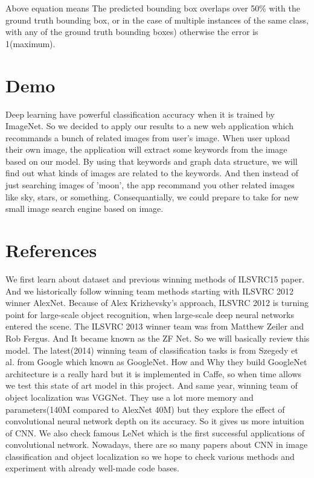\documentclass[10pt,twocolumn,letterpaper]{article}
\begin{document}
Above equation means The predicted bounding box overlaps over 50\% with the ground truth bounding box, or in the case of multiple instances of the same class, with any of the ground truth bounding boxes) otherwise the error is 1(maximum).

\section{Demo}

Deep learning have powerful classification accuracy when it is trained by ImageNet.
So we decided to apply our results to a new web application which recommands a bunch of related images from user's image.
When user upload their own image, the application will extract some keywords from the image based on our model.
By using that keywords and graph data structure, we will find out what kinds of images are related to the keywords.
And then instead of just searching images of 'moon', the app recommand you other related images like sky, stars, or something.
Consequantially, we could prepare to take for new small image search engine based on image.

\section{References}

We first learn about dataset and previous winning methods of ILSVRC15 paper. \cite{ILSVRC15}
And we historically follow winning team methods starting with ILSVRC 2012 winner AlexNet. \cite{AlexNet}
Because of Alex Krizhevsky's approach, ILSVRC 2012 is turning point for large-scale object recognition, when large-scale deep neural networks entered the scene.
The ILSVRC 2013 winner team was from Matthew Zeiler and Rob Fergus.
And It became known as the ZF Net.\cite{ZFNet} So we will basically review this model.
The latest(2014) winning team of classification tasks is from Szegedy et al. from Google which known as GoogleNet. \cite{GoogleNet}
How and Why they build GoogleNet architecture is a really hard but it is implemented in Caffe, so when time allows we test this state of art model in this project.
And same year, winning team of object localization was VGGNet. \cite{VGGNet}
They use a lot more memory and parameters(140M compared to AlexNet 40M) but they explore the effect of convolutional neural network depth on its accuracy.
So it gives us more intuition of CNN.
We also check famous LeNet \cite{LeNet} which is the first successful applications of convolutional network.
Nowadays, there are so many papers about CNN in image classification and object localization so we hope to check various methods and experiment with already well-made code bases.

{\small


}
\end{document}
